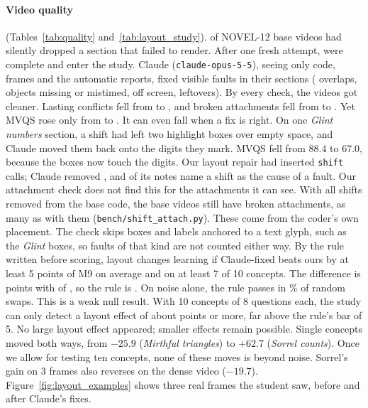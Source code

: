 \paragraph{Video quality} (Tables~\ref{tab:quality} and~\ref{tab:layout_study}). \AdmIncompleteBefore{} of
\AdmTotal{} NOVEL-12 base videos had silently dropped a section that failed to render. After one fresh attempt,
\AdmComplete{} were complete and enter the study. Claude (\texttt{claude-opus-5-5}), seeing only code, frames and the
automatic reports, fixed \ClaudeFaults{} visible faults in their \ClaudeSections{} sections (\ClaudeOverlap{} overlaps,
\ClaudeOther{} objects missing or mistimed, \ClaudeOffScreen{} off screen, \ClaudeLeftover{} leftovers). By every
check, the videos got cleaner. Lasting conflicts fell from \LSOursConflicts{} to \LSClaudeConflicts{}, and broken
attachments fell from \LSOursAttach{} to \LSClaudeAttach{}. Yet MVQS rose only from \LSOursMvqs{} to
\LSClaudeMvqs{}. It can even fall when a fix is right. On one \emph{Glint numbers} section, a shift had left two
highlight boxes over empty space, and Claude moved them back onto the digits they mark. MVQS fell from 88.4 to 67.0,
because the boxes now touch the digits. Our layout repair had inserted \ShiftsIn{} \texttt{shift} calls; Claude removed \ShiftsRemoved{}, and
\ShiftNotes{} of its notes name a shift as the cause of a fault. Our attachment check does not find this for the
attachments it can see. With all \ShiftsIn{} shifts removed from the base code, the base videos still have
\LSOursAttach{} broken attachments, as many as with them (\texttt{bench/shift\_attach.py}). These come from the
coder's own placement. The check skips boxes and labels anchored to a text glyph, such as the \emph{Glint} boxes, so
faults of that kind are not counted either way. By the rule written before scoring, layout changes
learning if Claude-fixed beats ours by at least 5 points of M9 on average and on at least 7 of 10 concepts. The
difference is \LSDiff{} points with \LSWins{} of \LSN{}, so the rule is \LSGate{}. On noise alone, the rule
passes in \NMRuleFPR\% of random swaps. This is a weak null result. With 10 concepts of 8 questions each, the study
can only detect a layout effect of about \NMLayoutMDE{} points or more, far above the rule's bar of 5. No large
layout effect appeared; smaller effects remain possible. Single concepts moved both ways, from
$-25.9$ (\emph{Mirthful triangles}) to $+62.7$ (\emph{Sorrel counts}). Once we allow for testing ten concepts, none of
these moves is beyond noise. Sorrel's gain on 3 frames also reverses on the dense video ($-19.7$).
Figure~\ref{fig:layout_examples} shows three real frames the student saw, before and after Claude's fixes.

